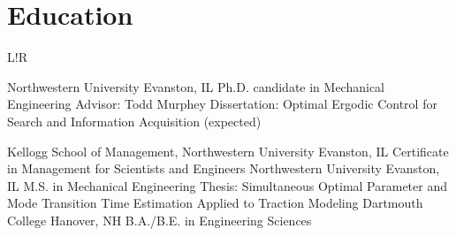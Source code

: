 \documentclass[10pt]{article}
\newcommand\VRule{\color{lightgray}\vrule width 0.5pt}
\newenvironment{cvtable}{
\vspace{-10 pt}
\begin{longtable}{L!{\VRule }R}
}{
\end{longtable}
}
\newcommand{\cvsect}[1]{
\vspace{-10  pt}
\section*{#1}
\vspace{-5 pt}
}
\begin{document}
\cvsect{Education}
\begin{cvtable}
  {Northwestern University}%
  {Evanston, IL} %
  {Ph.D. candidate in Mechanical Engineering}%
  {Advisor: Todd Murphey %
    \newline Dissertation: Optimal Ergodic Control for Search and
    Information Acquisition}%
  {(expected)}

%
  {Kellogg School of Management, Northwestern University}%
  {Evanston, IL}%
  {Certificate in Management for Scientists and Engineers}
%
  {Northwestern University}%
  {Evanston, IL}%
  {M.S. in Mechanical Engineering}%
  {Thesis: Simultaneous Optimal Parameter and Mode Transition Time
    Estimation Applied to Traction Modeling}
%
  {Dartmouth College}%
  {Hanover, NH}%
  {B.A./B.E. in Engineering Sciences}
\end{cvtable}
\end{document}
